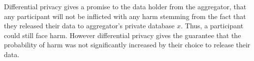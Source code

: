 \documentclass[11pt]{article}
\theoremstyle{definition}
\begin{document}
Differential privacy gives a promise to the data holder from the aggregator, that any participant will not be inflicted with any harm stemming from the fact that they released their data to aggregator's private database $x$. Thus, a participant could still face harm. However differential privacy gives the guarantee that the probability of harm was not significantly increased by their choice to release their data. %

\end{document}

